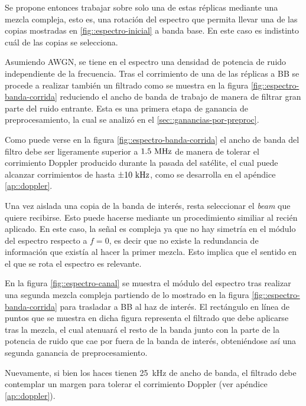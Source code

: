 \documentclass[../../main.tex]{subfiles}
\begin{document}
Se propone entonces trabajar sobre solo una de estas réplicas mediante una mezcla compleja, esto es, una rotación del espectro que permita llevar una de las copias mostradas en \ref{fig::espectro-inicial} a banda base. En este caso es indistinto cuál de las copias se selecciona. 

Asumiendo AWGN, se tiene en el espectro una densidad de potencia de ruido independiente de la frecuencia. Tras el corrimiento de una de las réplicas a BB se procede a realizar también un filtrado como se muestra en la figura \ref{fig::espectro-banda-corrida} reduciendo el ancho de banda de trabajo de manera de filtrar gran parte del ruido entrante. Esta es una primera etapa de ganancia de preprocesamiento, la cual se analizó en el \cref{sec::ganancias-por-preproc}. 

Como puede verse en la figura \ref{fig::espectro-banda-corrida} el ancho de banda del filtro debe ser ligeramente superior a $1.5~\textrm{MHz}$ de manera de tolerar el corrimiento Doppler producido durante la pasada del satélite, el cual puede alcanzar corrimientos de hasta $\pm 10~\textrm{kHz}$, como se desarrolla en el apéndice \ref{ap::doppler}.

Una vez aislada una copia de la banda de interés, resta seleccionar el \textit{beam} que quiere recibirse. Esto puede hacerse mediante un procedimiento similiar al recién aplicado. En este caso, la señal es compleja ya que no hay simetría en el módulo del espectro respecto a $f = 0$, es decir que no existe la redundancia de información que existía al hacer la primer mezcla. Esto implica que el sentido en el que se rota el espectro es relevante.

En la figura \ref{fig::espectro-canal} se muestra el módulo del espectro tras realizar una segunda mezcla compleja partiendo de lo mostrado en la figura \ref{fig::espectro-banda-corrida} para trasladar a BB al haz de interés. El rectángulo en línea de puntos que se muestra en dicha figura representa el filtrado que debe aplicarse tras la mezcla, el cual atenuará el resto de la banda junto con la parte de la potencia de ruido que cae por fuera de la banda de interés, obteniéndose así una segunda ganancia de preprocesamiento.

Nuevamente, si bien los haces tienen 25~kHz de ancho de banda, el filtrado debe contemplar un margen para tolerar el corrimiento Doppler (ver apéndice \ref{ap::doppler}).

\end{document}
